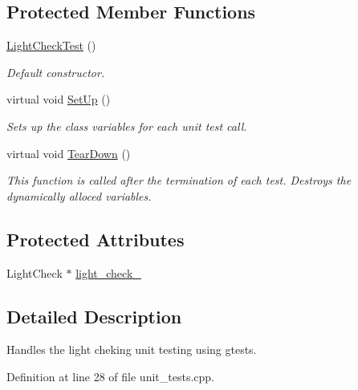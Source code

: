 \subsection*{Protected Member Functions}
\begin{DoxyCompactItemize}
\item 
\hyperlink{classLightCheckTest_a88246face9dda1dfa72818dbe8d15691}{Light\-Check\-Test} ()
\begin{DoxyCompactList}\small\item\em Default constructor. \end{DoxyCompactList}\item 
virtual void \hyperlink{classLightCheckTest_a65751984f27ae4993c4d1614255afe50}{Set\-Up} ()
\begin{DoxyCompactList}\small\item\em Sets up the class variables for each unit test call. \end{DoxyCompactList}\item 
virtual void \hyperlink{classLightCheckTest_a3191189a4f82b1e293fe96c2c7afe96d}{Tear\-Down} ()
\begin{DoxyCompactList}\small\item\em This function is called after the termination of each test. Destroys the dynamically alloced variables. \end{DoxyCompactList}\end{DoxyCompactItemize}
\subsection*{Protected Attributes}
\begin{DoxyCompactItemize}
\item 
Light\-Check $\ast$ \hyperlink{classLightCheckTest_a527cbecd400c0d4da6bad831b79e055f}{light\-\_\-check\-\_\-}
\end{DoxyCompactItemize}


\subsection{Detailed Description}
Handles the light cheking unit testing using gtests. 

Definition at line 28 of file unit\-\_\-tests.\-cpp.



